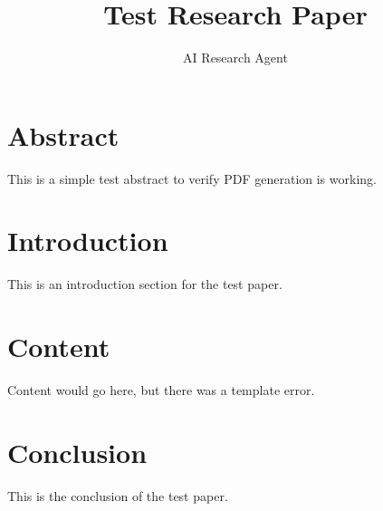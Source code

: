 \documentclass{article}
\begin{document}
        \title{{Test Research Paper}}
        \author{AI Research Agent}
        \maketitle
        
        \section*{Abstract}
        This is a simple test abstract to verify PDF generation is working.
        
        \section{Introduction}
        This is an introduction section for the test paper.
        
        \section{Content}
        Content would go here, but there was a template error.
        
        \section{Conclusion}
        This is the conclusion of the test paper.
        
        
\end{document}
